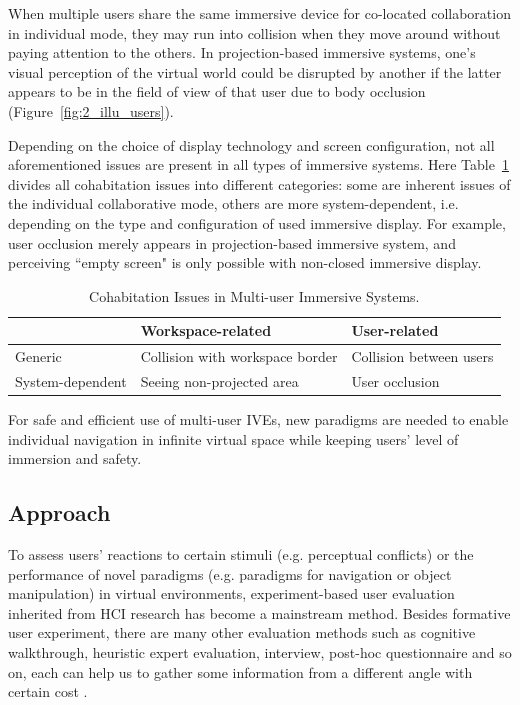 When multiple users share the same immersive device for co-located collaboration in individual mode, they may run into collision when they move around without paying attention to the others. In projection-based immersive systems, one's visual perception of the virtual world could be disrupted by another if the latter appears to be in the field of view of that user due to body occlusion (Figure~\ref{fig:2_illu_users}).

Depending on the choice of display technology and screen configuration, not all aforementioned issues are present in all types of immersive systems. Here Table~\ref{tab:cohab_issues} divides all cohabitation issues into different categories: some are inherent issues of the individual collaborative mode, others are more system-dependent, i.e. depending on the type and configuration of used immersive display. For example, user occlusion merely appears in projection-based immersive system, and perceiving ``empty screen" is only possible with non-closed immersive display. 

\begin{table}[htb]
\renewcommand{\arraystretch}{1.3}
\caption{Cohabitation Issues in Multi-user Immersive Systems.}
\label{tab:cohab_issues}
\centering
\begin{tabular}{l | l l}
   & Workspace-related & User-related \\ \hline
  Generic & Collision with workspace border & Collision between users \\
  System-dependent & Seeing non-projected area & User occlusion \\
\end{tabular}
\end{table}

For safe and efficient use of multi-user IVEs, new paradigms are needed to enable individual navigation in infinite virtual space while keeping users' level of immersion and safety.



\subsection{Approach}
To assess users' reactions to certain stimuli (e.g. perceptual conflicts) or the performance of novel paradigms (e.g. paradigms for navigation or object manipulation) in virtual environments, experiment-based user evaluation inherited from HCI research has become a mainstream method. Besides formative user experiment, there are many other evaluation methods such as cognitive walkthrough, heuristic expert evaluation, interview, post-hoc questionnaire and so on, each can help us to gather some information from a different angle with certain cost \citep{Bowman2002Survey}.

